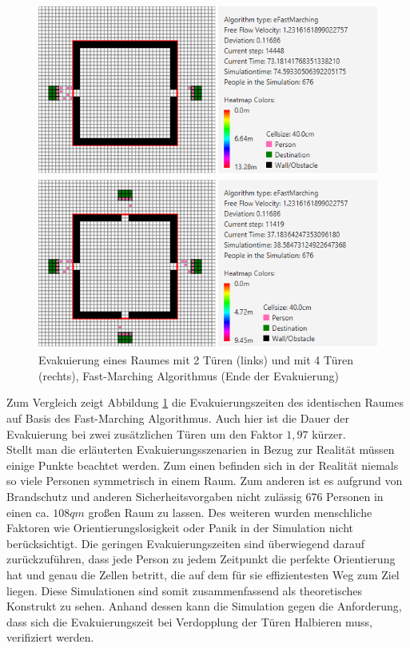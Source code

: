 \begin{figure}[!htb]
	\centering
	\begin{minipage}{.5\textwidth}
		\centering
		\includegraphics[width=\textwidth]{abbildungen/Evak2TuerenEndeFM.png}

	\end{minipage}%
	\begin{minipage}{0.5\textwidth}
		\centering
		\includegraphics[width=\textwidth]{abbildungen/Evak4TuerenEndeFM.png}
	\end{minipage}
	\caption{Evakuierung eines Raumes mit 2 Türen (links) und mit 4 Türen (rechts), Fast-Marching Algorithmus (Ende der Evakuierung)}
	\label{fig:Eva2T4TEndeFM}
	\end{figure}

Zum Vergleich zeigt Abbildung \ref{fig:Eva2T4TEndeFM} die Evakuierungszeiten des identischen Raumes auf Basis des Fast-Marching Algorithmus. Auch hier ist die Dauer der Evakuierung bei zwei zusätzlichen Türen um den Faktor $1,97$ kürzer.\\

Stellt man die erläuterten Evakuierungsszenarien in Bezug zur Realität müssen einige Punkte beachtet werden. Zum einen befinden sich in der Realität niemals so viele Personen symmetrisch in einem Raum. Zum anderen ist es aufgrund von Brandschutz und anderen Sicherheitsvorgaben nicht zulässig $676$ Personen in einen ca. $108qm$ großen Raum zu lassen. Des weiteren wurden menschliche Faktoren wie Orientierungslosigkeit oder Panik in der Simulation nicht berücksichtigt. Die geringen Evakuierungszeiten sind überwiegend darauf zurückzuführen, dass jede Person zu jedem Zeitpunkt die perfekte Orientierung hat und genau die Zellen betritt, die auf dem für sie effizientesten Weg zum Ziel liegen. Diese Simulationen sind somit zusammenfassend als theoretisches Konstrukt zu sehen. Anhand dessen kann die Simulation gegen die Anforderung, dass sich die Evakuierungszeit bei Verdopplung der Türen Halbieren muss, verifiziert werden.

